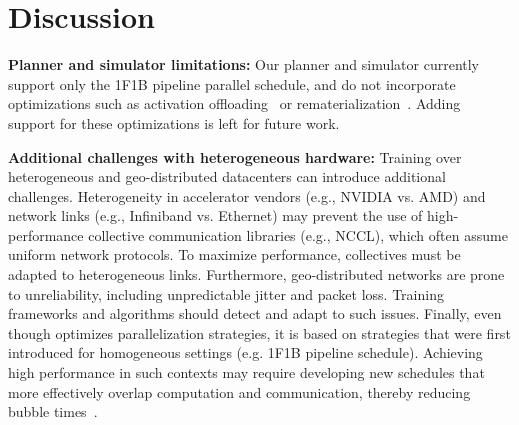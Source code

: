 \section{Discussion}

\textbf{Planner and simulator limitations: } Our planner and simulator currently support only the 1F1B pipeline parallel schedule, and do not incorporate optimizations such as activation offloading~\cite{Ren21zerooffload} or rematerialization~\cite{Yuan25remat}. Adding support for these optimizations is left for future work.

\textbf{Additional challenges with heterogeneous hardware:} Training over heterogeneous and geo-distributed datacenters can introduce additional challenges. Heterogeneity in accelerator vendors (e.g., NVIDIA vs. AMD) and network links (e.g., Infiniband vs. Ethernet) may prevent the use of high-performance collective communication libraries (e.g., NCCL), which often assume uniform network protocols. 
To maximize performance, collectives must be adapted to heterogeneous links. Furthermore, geo-distributed networks are prone to unreliability, including unpredictable jitter and packet loss. Training frameworks and algorithms should detect and adapt to such issues. Finally, even though \sailor optimizes parallelization strategies, it is based on strategies that were first introduced for homogeneous settings (e.g. 1F1B pipeline schedule). Achieving high performance in such contexts may require developing new schedules that more effectively overlap computation and communication, thereby reducing bubble times~\cite{chen2025crosspipe}.


